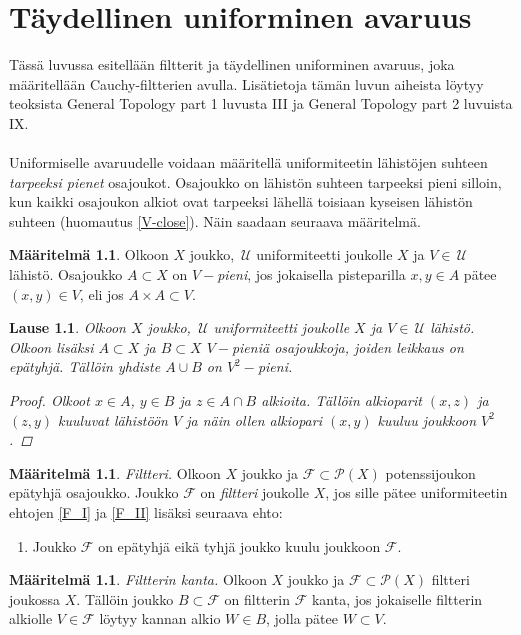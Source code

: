 \documentclass[12pt,a4paper,leqno]{report}
\newcommand{\U}{\,\mathcal{U}}
\newcommand{\Pot}{\mathcal{P}}
\newcommand{\F}{\mathcal{F}}
\theoremstyle{plain}
\newtheorem{lause}[equation]{Lause}
\theoremstyle{definition}
\newtheorem{maar}[equation]{Määritelmä}
\theoremstyle{remark}
\begin{document}
\chapter{Täydellinen uniforminen avaruus}
Tässä luvussa esitellään filtterit ja täydellinen uniforminen avaruus, joka määritellään Cauchy-filtterien avulla. 
Lisätietoja tämän luvun aiheista löytyy teoksista General Topology part 1 \cite{Eom1} luvusta III ja General Topology part 2 \cite{Eom2} luvuista IX.
\\
\\
Uniformiselle avaruudelle voidaan määritellä 
uniformiteetin lähistöjen suhteen \emph{tarpeeksi pienet} osa\-jou\-kot. 
Osajoukko on lähistön suhteen tarpeeksi pieni silloin, 
kun kaikki osajoukon alkiot ovat 
tarpeeksi lähellä toisiaan kyseisen lähistön suhteen (huomautus \ref{V-close}). 
Näin saadaan seuraava määritelmä.
\begin{maar}
Olkoon $X$ joukko, $\U$ uniformiteetti joukolle $X$ ja $V\in\U$ lähistö. 
Osajoukko $A\subset X$ on \emph{$V-$pieni}, jos 
jokaisella pisteparilla $x,y\in A$ pätee $(x,y)\in V$, eli jos $A\times A\subset V$.
\end{maar}
\begin{lause}
Olkoon $X$ joukko, $\U$ uniformiteetti joukolle $X$ ja $V\in\U$ lähistö. 
Olkoon lisäksi $A\subset X$ ja $B\subset X$ $V-$pieniä osajoukkoja, 
joiden leikkaus on epätyhjä. 
Tällöin yhdiste $A\cup B$ on $V^2-$pieni.
\begin{proof}
Olkoot $x\in A$, $y\in B$ ja $z\in A\cap B$ alkioita. 
Tällöin alkioparit $(x,z)$ ja $(z,y)$ kuuluvat lähistöön $V$ 
ja näin ollen alkiopari $(x,y)$ kuuluu joukkoon $V^2$.
\end{proof}
\end{lause}
\begin{maar}\label{filtteri_maar}
\emph{Filtteri.} Olkoon $X$ joukko ja $\F\subset \Pot(X)$ potenssijoukon epätyhjä osa\-joukko. 
Joukko $\F$ on \emph{filtteri} joukolle $X$, jos sille pätee 
uniformiteetin ehtojen \ref{F_I} ja \ref{F_II} lisäksi 
seuraava ehto:
\begin{enumerate} [label=(F),ref=(F)]
\item\label{filtteriehto} Joukko $\F$ on epätyhjä eikä tyhjä joukko kuulu joukkoon $\F$.
\end{enumerate} 
\end{maar}
\begin{maar}
\emph{Filtterin kanta.} 
Olkoon $X$ joukko ja $\F\subset \Pot(X)$ filtteri joukossa $X$. 
Tällöin joukko $B\subset \F$ on filtterin $\F$ kanta, 
jos jokaiselle filtterin alkiolle $V\in \F$ 
löytyy kannan alkio $W\in B $, jolla pätee $W\subset V$.
\end{maar}
\end{document}
